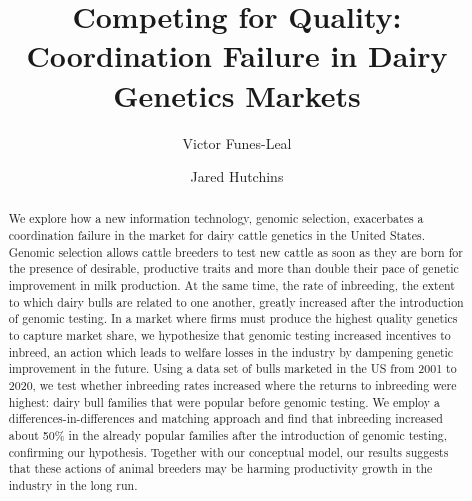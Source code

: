 \documentclass[12pt,letterpaper]{article}
\title{Competing for Quality: Coordination Failure in Dairy Genetics Markets}
\author[1]{Victor Funes-Leal}
\author[2]{Jared Hutchins}
\affil[1]{Department of Agricultural Economics and Agribusiness\\ University of Arkansas}
\affil[2]{Department of Agricultural and Consumer Economics\\ University of Illinois Urbana Champaign}
\date{} %
\begin{document}
\maketitle



\begin{abstract}
    \noindent
    \singlespacing
    
    We explore how a new information technology, genomic selection, exacerbates a coordination failure in the market for dairy cattle genetics in the United States. 
    Genomic selection allows cattle breeders to test new cattle as soon as they are born for the presence of desirable, productive traits and more than double their pace of genetic improvement in milk production. At the same time, the rate of inbreeding, the extent to which dairy bulls are related to one another, greatly increased after the introduction of genomic testing.
    In a market where firms must produce the highest quality genetics to capture market share, we hypothesize that genomic testing increased incentives to inbreed, an action which leads to welfare losses in the industry by dampening genetic improvement in the future.
    Using a data set of bulls marketed in the US from 2001 to 2020, we test whether inbreeding rates increased where the returns to inbreeding were highest: dairy bull families that were popular before genomic testing.
    We employ a differences-in-differences and matching approach and find that inbreeding increased about 50\% in the already popular families after the introduction of genomic testing, confirming our hypothesis. 
    Together with our conceptual model, our results suggests that these actions of animal breeders may be harming productivity growth in the industry in the long run.
\end{abstract}
\end{document}
